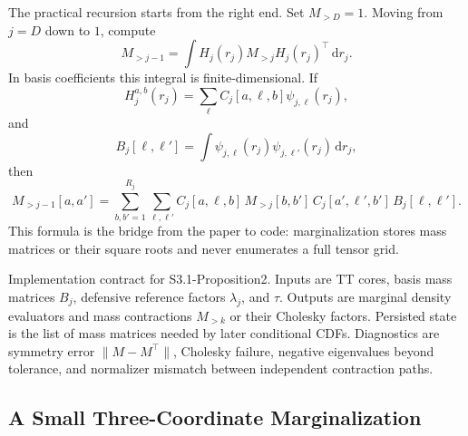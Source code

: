 \documentclass[11pt]{article}
\newcommand{\dd}{\,\mathrm d}
\begin{document}
The practical recursion starts from the right end.  Set \(M_{>D}=1\).  Moving
from \(j=D\) down to \(1\), compute
\[
    M_{>j-1}
    =
    \int H_j(r_j)M_{>j}H_j(r_j)^\top\dd r_j.
    \tag{M5}
\]
In basis coefficients this integral is finite-dimensional.  If
\[
    H_j^{a,b}(r_j)=\sum_{\ell}C_j[a,\ell,b]\psi_{j,\ell}(r_j),
\]
and
\[
    B_j[\ell,\ell']
    =
    \int \psi_{j,\ell}(r_j)\psi_{j,\ell'}(r_j)\dd r_j,
\]
then
\[
    M_{>j-1}[a,a']
    =
    \sum_{b,b'=1}^{R_j}
    \sum_{\ell,\ell'}
    C_j[a,\ell,b]\,M_{>j}[b,b']\,C_j[a',\ell',b']\,B_j[\ell,\ell'].
    \tag{M6}
\]
This formula is the bridge from the paper to code: marginalization stores mass
matrices or their square roots and never enumerates a full tensor grid.

Implementation contract for S3.1-Proposition2.  Inputs are TT cores, basis mass
matrices \(B_j\), defensive reference factors \(\lambda_j\), and \(\tau\).
Outputs are marginal density evaluators and mass contractions \(M_{>k}\) or
their Cholesky factors.  Persisted state is the list of mass matrices needed by
later conditional CDFs.  Diagnostics are symmetry error
\(\|M-M^\top\|\), Cholesky failure, negative eigenvalues beyond tolerance, and
normalizer mismatch between independent contraction paths.

\begin{center}
\end{center}

\subsection{A Small Three-Coordinate Marginalization}
\end{document}

